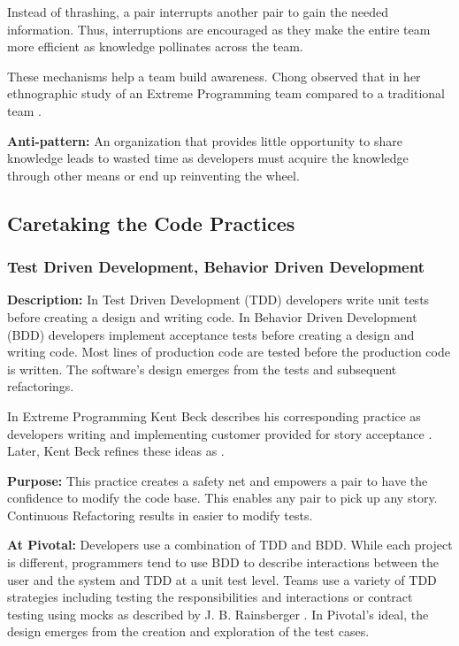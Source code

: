 Instead of thrashing, a pair interrupts another pair to gain the needed information. Thus, interruptions are encouraged as they make the entire team more efficient as knowledge pollinates across the team. 

These mechanisms help a team build awareness. Chong observed that  in her ethnographic study of an Extreme Programming team compared to a traditional team \cite{ChongNominum}.
 
\textbf{Anti-pattern:} An organization that provides little opportunity to share knowledge leads to wasted time as developers must acquire the knowledge through other means or end up reinventing the wheel.
\subsection{Caretaking the Code Practices}
\subsubsection{Test Driven Development, Behavior Driven Development}
\textbf{Description:} In Test Driven Development (TDD) developers write unit tests before creating a design and writing code. In Behavior Driven Development (BDD) developers implement acceptance tests before creating a design and writing code. Most lines of production code are tested before the production code is written. The software's design emerges from the tests and subsequent refactorings.

In Extreme Programming Kent Beck describes his corresponding  practice as developers writing  and implementing customer provided  for story acceptance \cite{BeckExtremeProgramming2000}. Later, Kent Beck refines these ideas as  \cite{BeckExtremeProgramming2004}. 

\textbf{Purpose:} This practice creates a safety net and empowers a pair to have the confidence to modify the code base. This enables any pair to pick up any story. Continuous Refactoring results in easier to modify tests.

\textbf{At Pivotal:} Developers use a combination of TDD and BDD. While each project is different, programmers tend to use BDD to describe interactions between the user and the system and TDD at a unit test level. Teams use a variety of TDD strategies including testing the responsibilities and interactions \cite{Goose} or contract testing using mocks as described by J. B. Rainsberger \cite{RainsbergerIntegrationTestsYouTube}. In Pivotal's ideal, the design emerges from the creation and exploration of the test cases.  


